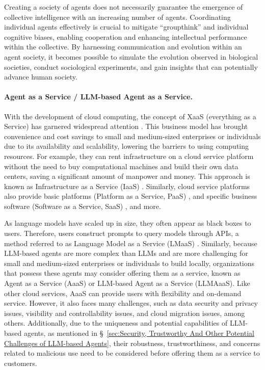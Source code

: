 Creating a society of agents does not necessarily guarantee the emergence of collective intelligence with an increasing number of agents.
Coordinating individual agents effectively is crucial to mitigate ``groupthink'' and individual cognitive biases, enabling cooperation and enhancing intellectual performance within the collective. 
By harnessing communication and evolution within an agent society, it becomes possible to simulate the evolution observed in biological societies, conduct sociological experiments, and gain insights that can potentially advance human society.




\paragraph{Agent as a Service / LLM-based Agent as a Service.}
With the development of cloud computing, the concept of XaaS (everything as a Service) has garnered widespread attention \cite{DBLP:conf/IEEEcloud/DuanFZSNH15}. 
This business model has brought convenience and cost savings to small and medium-sized enterprises or individuals due to its availability and scalability, lowering the barriers to using computing resources. 
For example, they can rent infrastructure on a cloud service platform without the need to buy computational machines and build their own data centers, saving a significant amount of manpower and money. This approach is known as Infrastructure as a Service (IaaS) \cite{bhardwaj2010cloud,serrano2015infrastructure}. Similarly, cloud service platforms also provide basic platforms (Platform as a Service, PaaS) \cite{mell2011nist,lawton2008developing}, and specific business software (Software as a Service, SaaS) \cite{sun2007software, dubey2007delivering}, and more.

As language models have scaled up in size, they often appear as black boxes to users. Therefore, users construct prompts to query models through APIs, a method referred to as Language Model as a Service (LMaaS) \cite{DBLP:conf/icml/SunSQHQ22}. 
Similarly, because LLM-based agents are more complex than LLMs and are more challenging for small and medium-sized enterprises or individuals to build locally, organizations that possess these agents may consider offering them as a service, known as Agent as a Service (AaaS) or LLM-based Agent as a Service (LLMAaaS). Like other cloud services, AaaS can provide users with flexibility and on-demand service. However, it also faces many challenges, such as data security and privacy issues, visibility and controllability issues, and cloud migration issues, among others. Additionally, due to the uniqueness and potential capabilities of LLM-based agents, as mentioned in \S \ \ref{sec:Security, Trustworthy And Other Potential Challenges of LLM-based Agents}, their robustness, trustworthiness, and concerns related to malicious use need to be considered before offering them as a service to customers.







